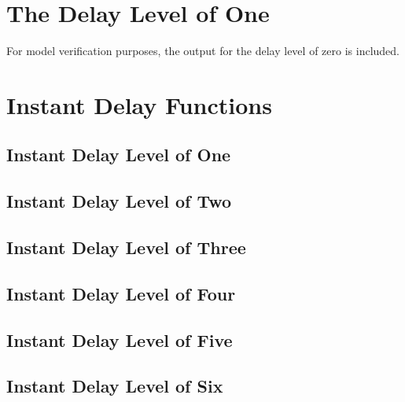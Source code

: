 \section{The Delay Level of One}
For model verification purposes, the output for the delay level of zero is included.

\begin{small}
\end{small}







\section{Instant Delay Functions}

\subsection{Instant Delay Level of One}

\subsection{Instant Delay Level of Two}

\subsection{Instant Delay Level of Three}

\subsection{Instant Delay Level of Four}

\subsection{Instant Delay Level of Five}

\subsection{Instant Delay Level of Six}






